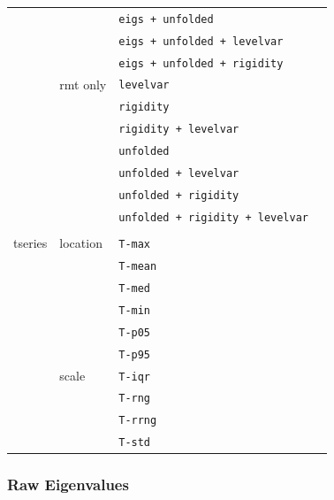 \documentclass[12pt]{spieman}  %
\newcommand{\tcode}[1]{\footnotesize\texttt{#1}\normalsize}
\begin{document}
\begin{spacing}{2}
\begin{table}[h!]
\begin{tabular}{lllr}
               &               & \tcode{eigs + unfolded}                \\
               &               & \tcode{eigs + unfolded + levelvar}     \\
               &               & \tcode{eigs + unfolded + rigidity}     \\
               & rmt only      & \tcode{levelvar}                       \\
               &               & \tcode{rigidity}                       \\
               &               & \tcode{rigidity + levelvar}            \\
               &               & \tcode{unfolded}                       \\
               &               & \tcode{unfolded + levelvar}            \\
               &               & \tcode{unfolded + rigidity}            \\
               &               & \tcode{unfolded + rigidity + levelvar} \\
               &               &                                        \\
tseries        & location      & \tcode{T-max}                          \\
               &               & \tcode{T-mean}                         \\
               &               & \tcode{T-med}                          \\
               &               & \tcode{T-min}                          \\
               &               & \tcode{T-p05}                          \\
               &               & \tcode{T-p95}                          \\
               & scale         & \tcode{T-iqr}                          \\
               &               & \tcode{T-rng}                          \\
               &               & \tcode{T-rrng}                         \\
               &               & \tcode{T-std}                          \\
\hline
\end{tabular}
\end{table}

\subsubsection{Raw Eigenvalues}
\label{sec:raw-eigs}


\end{spacing}
\end{document}
